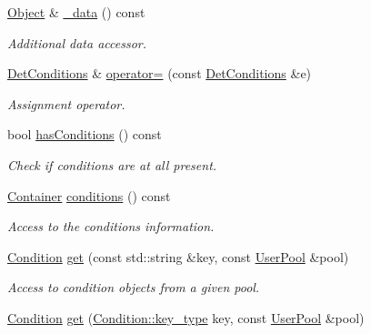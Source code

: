 \begin{DoxyCompactItemize}
\hyperlink{class_d_d4hep_1_1_geometry_1_1_det_element_object}{Object} \& \hyperlink{class_d_d4hep_1_1_conditions_1_1_det_conditions_a07ac5ff6cc7113eed2568952951bc8df}{\_\-data} () const 
\begin{DoxyCompactList}\small\item\em Additional data accessor. \item\end{DoxyCompactList}\item 
\hyperlink{class_d_d4hep_1_1_conditions_1_1_det_conditions}{DetConditions} \& \hyperlink{class_d_d4hep_1_1_conditions_1_1_det_conditions_aea710da17ca864a0528a7b3503c16d2d}{operator=} (const \hyperlink{class_d_d4hep_1_1_conditions_1_1_det_conditions}{DetConditions} \&e)
\begin{DoxyCompactList}\small\item\em Assignment operator. \item\end{DoxyCompactList}\item 
bool \hyperlink{class_d_d4hep_1_1_conditions_1_1_det_conditions_a1e7e83b427b3e91aac8218f6cea503ed}{hasConditions} () const 
\begin{DoxyCompactList}\small\item\em Check if conditions are at all present. \item\end{DoxyCompactList}\item 
\hyperlink{class_d_d4hep_1_1_conditions_1_1_container}{Container} \hyperlink{class_d_d4hep_1_1_conditions_1_1_det_conditions_a647bd874d691721d29a739b912e8c02e}{conditions} () const 
\begin{DoxyCompactList}\small\item\em Access to the conditions information. \item\end{DoxyCompactList}\item 
\hyperlink{class_d_d4hep_1_1_conditions_1_1_condition}{Condition} \hyperlink{class_d_d4hep_1_1_conditions_1_1_det_conditions_aae12a60c145a9aee9dc098db5fd8eb7b}{get} (const std::string \&key, const \hyperlink{class_d_d4hep_1_1_conditions_1_1_user_pool}{UserPool} \&pool)
\begin{DoxyCompactList}\small\item\em Access to condition objects from a given pool. \item\end{DoxyCompactList}\item 
\hyperlink{class_d_d4hep_1_1_conditions_1_1_condition}{Condition} \hyperlink{class_d_d4hep_1_1_conditions_1_1_det_conditions_a4c19cc72b89329e39cd0123229cba3d0}{get} (\hyperlink{class_d_d4hep_1_1_conditions_1_1_condition_a7528efa762e8cc072ef80ea67c3531f9}{Condition::key\_\-type} key, const \hyperlink{class_d_d4hep_1_1_conditions_1_1_user_pool}{UserPool} \&pool)

\end{DoxyCompactItemize}
